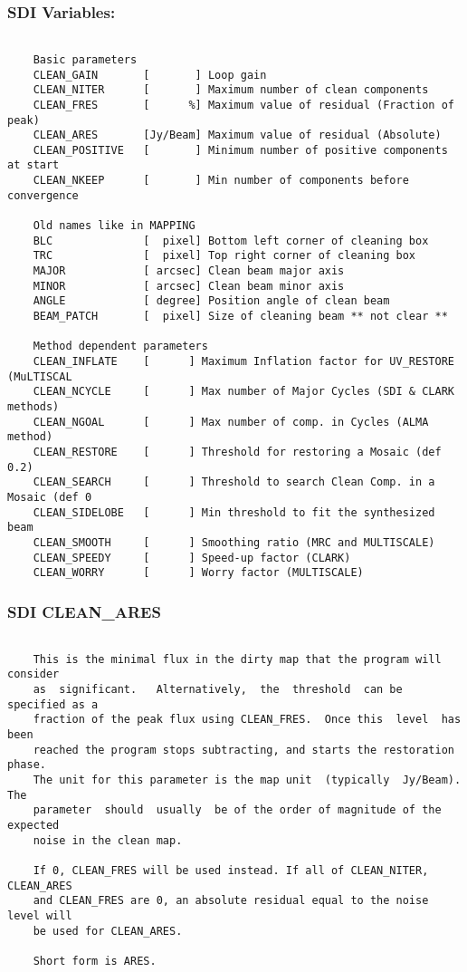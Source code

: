 \subsubsection{SDI Variables:}
\begin{verbatim}

    Basic parameters
    CLEAN_GAIN       [       ] Loop gain
    CLEAN_NITER      [       ] Maximum number of clean components
    CLEAN_FRES       [      %] Maximum value of residual (Fraction of peak)
    CLEAN_ARES       [Jy/Beam] Maximum value of residual (Absolute)
    CLEAN_POSITIVE   [       ] Minimum number of positive components at start
    CLEAN_NKEEP      [       ] Min number of components before convergence

    Old names like in MAPPING
    BLC              [  pixel] Bottom left corner of cleaning box
    TRC              [  pixel] Top right corner of cleaning box
    MAJOR            [ arcsec] Clean beam major axis
    MINOR            [ arcsec] Clean beam minor axis
    ANGLE            [ degree] Position angle of clean beam
    BEAM_PATCH       [  pixel] Size of cleaning beam ** not clear **

    Method dependent parameters
    CLEAN_INFLATE    [      ] Maximum Inflation factor for UV_RESTORE (MuLTISCAL
    CLEAN_NCYCLE     [      ] Max number of Major Cycles (SDI & CLARK methods)
    CLEAN_NGOAL      [      ] Max number of comp. in Cycles (ALMA method)
    CLEAN_RESTORE    [      ] Threshold for restoring a Mosaic (def 0.2)
    CLEAN_SEARCH     [      ] Threshold to search Clean Comp. in a Mosaic (def 0
    CLEAN_SIDELOBE   [      ] Min threshold to fit the synthesized beam
    CLEAN_SMOOTH     [      ] Smoothing ratio (MRC and MULTISCALE)
    CLEAN_SPEEDY     [      ] Speed-up factor (CLARK)
    CLEAN_WORRY      [      ] Worry factor (MULTISCALE)
\end{verbatim}
\subsubsection{SDI CLEAN\_ARES}
\begin{verbatim}

    This is the minimal flux in the dirty map that the program will consider
    as  significant.   Alternatively,  the  threshold  can be specified as a
    fraction of the peak flux using CLEAN_FRES.  Once this  level  has  been
    reached the program stops subtracting, and starts the restoration phase.
    The unit for this parameter is the map unit  (typically  Jy/Beam).   The
    parameter  should  usually  be of the order of magnitude of the expected
    noise in the clean map.

    If 0, CLEAN_FRES will be used instead. If all of CLEAN_NITER, CLEAN_ARES
    and CLEAN_FRES are 0, an absolute residual equal to the noise level will
    be used for CLEAN_ARES.

    Short form is ARES.

\end{verbatim}
